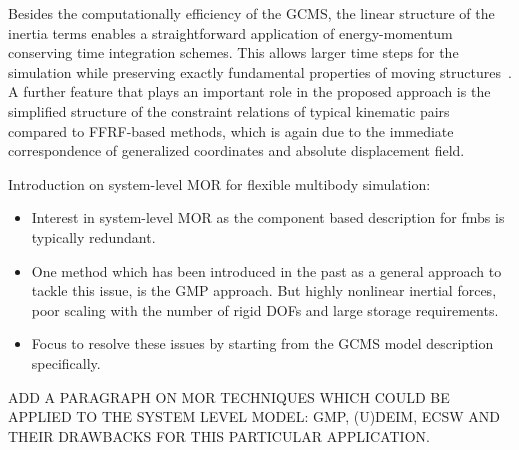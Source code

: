 Besides the computationally efficiency of the GCMS, the linear structure of the inertia terms enables a straightforward application of energy-momentum conserving time integration schemes. 
This allows larger time steps for the simulation while preserving exactly fundamental properties of moving structures~\cite{humergerstmayr2013}.
A further feature that plays an important role in the proposed approach is the simplified structure of the constraint relations of typical kinematic pairs compared to FFRF-based methods, which is again due to the immediate correspondence of generalized coordinates and absolute displacement field.

Introduction on system-level MOR for flexible multibody simulation:
\begin{itemize}
\item Interest in system-level MOR as the component based description for fmbs is typically redundant.
\item One method which has been introduced in the past as a general approach to tackle this issue, is the GMP approach. But highly nonlinear inertial forces, poor scaling with the number of rigid DOFs and large storage requirements.
\item Focus to resolve these issues by starting from the GCMS model description specifically. 
\end{itemize}
ADD A PARAGRAPH ON MOR TECHNIQUES WHICH COULD BE APPLIED TO THE SYSTEM LEVEL MODEL: GMP, (U)DEIM, ECSW AND THEIR DRAWBACKS FOR THIS PARTICULAR APPLICATION. 

